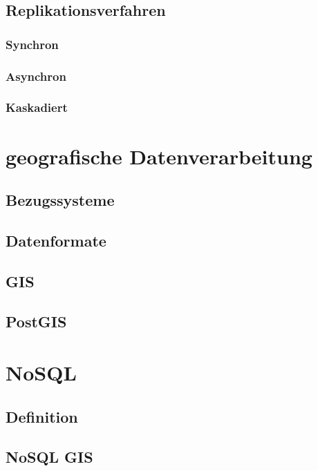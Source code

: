 \subsection{Replikationsverfahren}

\subsubsection{Synchron}

\subsubsection{Asynchron}

\subsubsection{Kaskadiert}


\section{geografische Datenverarbeitung}

\subsection{Bezugssysteme}

\subsection{Datenformate}

\subsection{GIS}

\subsection{PostGIS}



\section{NoSQL}

\subsection{Definition}

\subsection{NoSQL GIS}

